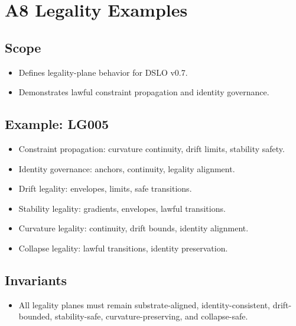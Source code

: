 \section{A8 Legality Examples}

\subsection{Scope}
\begin{itemize}
    \item Defines legality-plane behavior for DSLO v0.7.
    \item Demonstrates lawful constraint propagation and identity governance.
\end{itemize}

\subsection{Example: LG005}
\begin{itemize}
    \item Constraint propagation: curvature continuity, drift limits, stability safety.
    \item Identity governance: anchors, continuity, legality alignment.
    \item Drift legality: envelopes, limits, safe transitions.
    \item Stability legality: gradients, envelopes, lawful transitions.
    \item Curvature legality: continuity, drift bounds, identity alignment.
    \item Collapse legality: lawful transitions, identity preservation.
\end{itemize}

\subsection{Invariants}
\begin{itemize}
    \item All legality planes must remain substrate-aligned, identity-consistent, drift-bounded, stability-safe, curvature-preserving, and collapse-safe.
\end{itemize}
